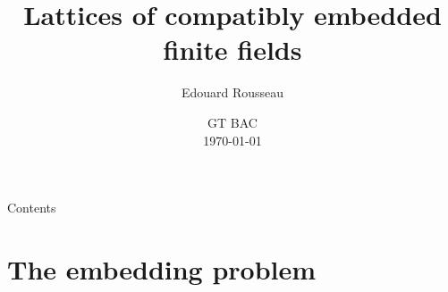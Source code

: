 \documentclass[xcolor=x11names,compress]{beamer}
\theoremstyle{break}
\theoremstyle{sc}
\theoremstyle{definition}
\theoremstyle{remark}
\begin{document}
\begin{frame}
  \title{Lattices of compatibly embedded finite fields}
  \author{Edouard Rousseau}
\date{GT BAC\\\today}
\titlepage
\end{frame}

\begin{frame}{Contents}
  \tableofcontents%
\end{frame}

\section{The embedding problem}
\end{document}

